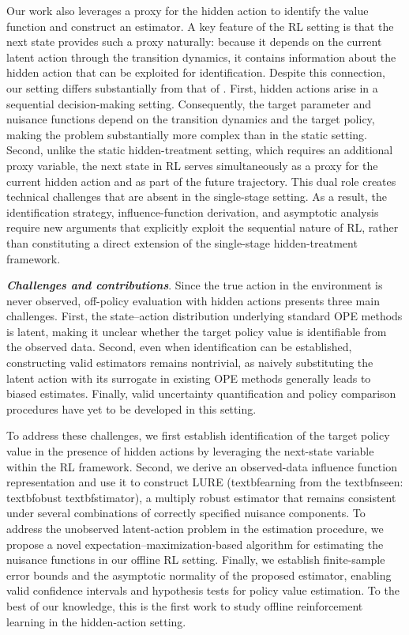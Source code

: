\documentclass[12pt]{article}
\newcommand{\0}{\boldsymbol{0}}
\begin{document}
Our work also leverages a proxy for the hidden action to identify the value function and construct an estimator. A key feature of the RL setting is that the next state provides such a proxy naturally: because it depends on the current latent action through the transition dynamics, it contains information about the hidden action that can be exploited for identification. Despite this connection, our setting differs substantially from that of \citet{zhou2024causal}. First, hidden actions arise in a sequential decision-making setting. Consequently, the target parameter and nuisance functions depend on the transition dynamics and the target policy, making the problem substantially more complex than in the static setting. Second, unlike the static hidden-treatment setting, which requires an additional proxy variable, the next state in RL serves simultaneously as a proxy for the current hidden action and as part of the future trajectory. This dual role creates technical challenges that are absent in the single-stage setting. As a result, the identification strategy, influence-function derivation, and asymptotic analysis require new arguments that explicitly exploit the sequential nature of RL, rather than constituting a direct extension of the single-stage hidden-treatment framework.


\textbf{\textit{Challenges and contributions}}. Since the true action in the environment is never observed, off-policy evaluation with hidden actions presents three main challenges. First, the state--action distribution underlying standard OPE methods is latent, making it unclear whether the target policy value is identifiable from the observed data. Second, even when identification can be established, constructing valid estimators remains nontrivial, as naively substituting the latent action with its surrogate in existing OPE methods generally leads to biased estimates. Finally, valid uncertainty quantification and policy comparison procedures have yet to be developed in this setting.

To address these challenges, we first establish identification of the target policy value in the presence of hidden actions by leveraging the next-state variable within the RL framework. Second, we derive an observed-data influence function representation and use it to construct LURE (\csname textbfearning from the \csname textbfnseen: \csname textbfobust \csname textbfstimator), a multiply robust estimator that remains consistent under several combinations of correctly specified nuisance components. To address the unobserved latent-action problem in the estimation procedure,
we propose a novel expectation--maximization-based algorithm for estimating the nuisance functions in our offline RL setting.
Finally, we establish finite-sample error bounds and the asymptotic normality of the proposed estimator, enabling valid confidence intervals and hypothesis tests for policy value estimation. To the best of our knowledge, this is the first work to study offline reinforcement learning in the hidden-action setting.
\end{document}
